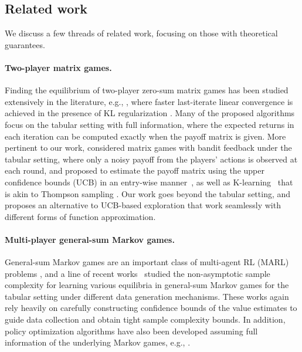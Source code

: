  
\subsection{Related work}
\label{sec:related}


We  discuss a few threads of related work, focusing on those with theoretical guarantees. 
 

\paragraph{Two-player matrix games.} Finding the equilibrium of two-player zero-sum matrix games has been studied extensively in the literature, e.g., \citet{mertikopoulos2018cycles,shapley1953stochastic,daskalakis2018last,wei2020linear}, where faster last-iterate linear convergence is achieved in the presence of KL regularization \citep{cen2021fast,zhan2023policy}. Many of the proposed algorithms focus on the tabular setting with full information, where the expected returns in each iteration can be computed exactly when the payoff matrix is given. More pertinent to our work, \citet{o2021matrix} considered matrix games with bandit feedback under the tabular setting, where only a noisy payoff from the players' actions is observed at each round, and proposed to estimate the payoff matrix using the upper confidence bounds (UCB) in an entry-wise manner~\citep{lai1987adaptive,bouneffouf2016finite}, as well as K-learning~\citep{o2021variational} that is akin to Thompson sampling \citep{russo2018tutorial}. Our work goes beyond the tabular setting, and proposes an alternative to UCB-based exploration that work seamlessly with different forms of function approximation.

 

\paragraph{Multi-player general-sum Markov games.} General-sum Markov games are an important class of multi-agent RL (MARL) problems \citep{littman1994markov}, and a line of recent works~\citep{liu2021sharp,bai2021sample,mao2023provably,song2021can,jin2021v,li2022minimax,sessa2022efficient} studied the non-asymptotic sample complexity for learning various equilibria in general-sum Markov games for the tabular setting under different data generation mechanisms. These works again rely heavily on carefully constructing confidence bounds of  the value estimates to guide data collection and obtain tight sample complexity bounds. In addition, policy optimization algorithms have also been developed assuming full information of the underlying Markov games, e.g., \citet{erez2023regret,zhang2022policy,cen2023faster}. 



